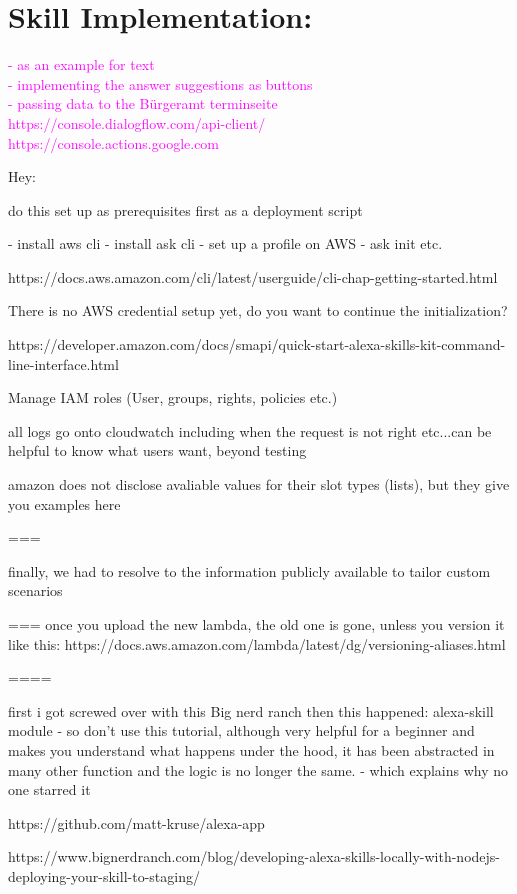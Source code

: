 \chapter{Skill Implementation: }
\label{maintwo}

\textcolor{magenta}{
- as an example for text\\
- implementing the answer suggestions as buttons\\
- passing data to the Bürgeramt terminseite\\
https://console.dialogflow.com/api-client/ \\
https://console.actions.google.com
}



Hey:

do this set up as prerequisites first
as a deployment script

- install aws cli
- install ask cli
- set up a profile on AWS
- ask init etc.

https://docs.aws.amazon.com/cli/latest/userguide/cli-chap-getting-started.html

There is no AWS credential setup yet, do you want to continue the initialization?

https://developer.amazon.com/docs/smapi/quick-start-alexa-skills-kit-command-line-interface.html



Manage IAM roles (User, groups, rights, policies etc.)


all logs go onto cloudwatch
including when the request is not right etc...can be helpful to know what users want, beyond testing





amazon does not disclose avaliable values for their slot types (lists), but they give you examples here


===

finally, we had to resolve to the information publicly available to tailor custom scenarios



 ===
once you upload the new lambda, the old one is gone, unless you version it like this:
https://docs.aws.amazon.com/lambda/latest/dg/versioning-aliases.html



====

first i got screwed over with this Big nerd ranch then this happened: alexa-skill module
- so don't use this tutorial, although very helpful for a beginner and makes you understand what happens under the hood, it has been abstracted in many other function and the logic is no longer the same. - which explains why no one starred it

https://github.com/matt-kruse/alexa-app

https://www.bignerdranch.com/blog/developing-alexa-skills-locally-with-nodejs-deploying-your-skill-to-staging/
